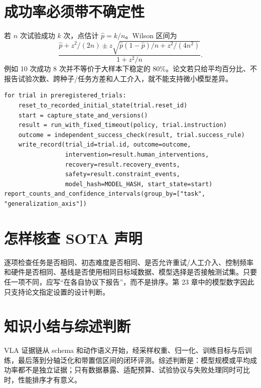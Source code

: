 \section{成功率必须带不确定性}

若 $n$ 次试验成功 $k$ 次，点估计 $\hat p=k/n$。Wilson 区间为
\begin{equation}
\frac{\hat p+z^2/(2n)\pm z\sqrt{\hat p(1-\hat p)/n+z^2/(4n^2)}}
{1+z^2/n}.
\label{eq:wilson-success}
\end{equation}
例如 10 次成功 8 次并不等价于大样本下稳定的 80\%。论文若只给平均百分比、不报告试验次数、跨种子/任务方差和人工介入，就不能支持微小模型差异。

\begin{lstlisting}[caption={可复核真机评测协议的最小记录循环}]
for trial in preregistered_trials:
    reset_to_recorded_initial_state(trial.reset_id)
    start = capture_state_and_versions()
    result = run_with_fixed_timeout(policy, trial.instruction)
    outcome = independent_success_check(result, trial.success_rule)
    write_record(trial_id=trial.id, outcome=outcome,
                 intervention=result.human_interventions,
                 recovery=result.recovery_events,
                 safety=result.constraint_events,
                 model_hash=MODEL_HASH, start_state=start)
report_counts_and_confidence_intervals(group_by=["task", "generalization_axis"])
\end{lstlisting}

\section{怎样核查 SOTA 声明}

逐项检查任务是否相同、初态难度是否相同、是否允许重试/人工介入、控制频率和硬件是否相同、基线是否使用相同目标域数据、模型选择是否接触测试集。只要任一项不同，应写“在各自协议下报告”，而不是排序。第 23 章中的模型数字因此只支持论文指定设置的设计判断。

\section{知识小结与综述判断}

VLA 证据链从 schema 和动作语义开始，经采样权重、归一化、训练目标与后训练，最后落到分轴泛化和带置信区间的闭环评测。综述判断是：模型规模或平均成功率都不是独立证据；只有数据暴露、适配预算、试验协议与失败处理同时可比时，性能排序才有意义。
